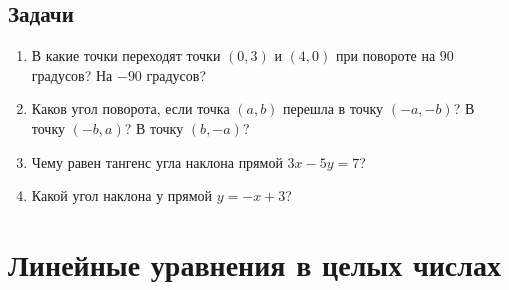 \subsection*{Задачи}

\begin{enumerate}
\item В какие точки переходят точки $(0,3)$ и $(4,0)$ при повороте на $90$ градусов? На $-90$ градусов?
\item Каков угол поворота, если точка $(a,b)$ перешла в точку $(-a,-b)$? В точку $(-b,a)$? В точку $(b,-a)$?
\item Чему равен тангенс угла наклона прямой $3x-5y=7$?
\item Какой угол наклона у прямой $y=-x+3$?
\end{enumerate}


\section{Линейные уравнения в целых числах}


